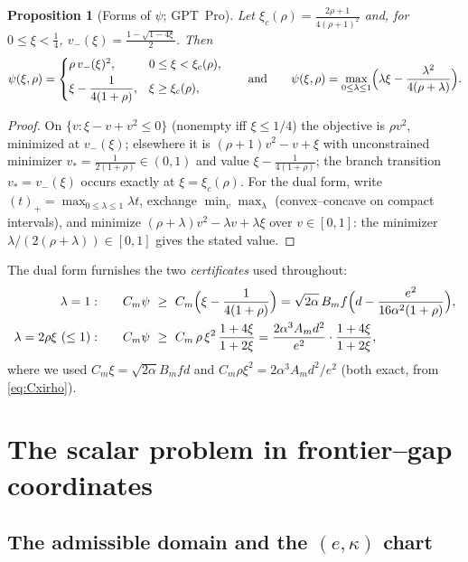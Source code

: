 \documentclass[11pt]{article}
\newtheorem{proposition}[theorem]{Proposition}
\newcommand{\pos}[1]{\left(#1\right)_{+}}
\begin{document}
\begin{proposition}[Forms of $\psi$; GPT~Pro]\label{prop:psi-forms}
Let $\xi_c(\rho)=\frac{2\rho+1}{4(\rho+1)^2}$ and, for $0\le\xi<\frac14$,
$v_-(\xi)=\frac{1-\sqrt{1-4\xi}}2$.  Then
\[
        \psi(\xi,\rho)=
        \begin{cases}
        \rho\,v_-(\xi)^2,&0\le\xi<\xi_c(\rho),\\[1mm]
        \xi-\dfrac1{4(1+\rho)},&\xi\ge\xi_c(\rho),
        \end{cases}
        \qquad\text{and}\qquad
        \psi(\xi,\rho)=\max_{0\le\lambda\le1}
        \Bigl(\lambda\xi-\frac{\lambda^2}{4(\rho+\lambda)}\Bigr).
\]
\end{proposition}

\begin{proof}
On $\{v:\xi-v+v^2\le0\}$ (nonempty iff $\xi\le1/4$) the objective is $\rho v^2$,
minimized at $v_-(\xi)$; elsewhere it is $(\rho+1)v^2-v+\xi$ with unconstrained
minimizer $v_*=\frac1{2(1+\rho)}\in(0,1)$ and value $\xi-\frac1{4(1+\rho)}$;
the branch transition $v_*=v_-(\xi)$ occurs exactly at $\xi=\xi_c(\rho)$.
For the dual form, write $\pos t=\max_{0\le\lambda\le1}\lambda t$, exchange
$\min_v\max_\lambda$ (convex--concave on compact intervals), and minimize
$(\rho+\lambda)v^2-\lambda v+\lambda\xi$ over $v\in[0,1]$: the minimizer
$\lambda/(2(\rho+\lambda))\in[0,1]$ gives the stated value.
\end{proof}

The dual form furnishes the two \emph{certificates} used throughout:
\begin{align}
\lambda=1:&\qquad
        C_m\psi\ \ge\ C_m\Bigl(\xi-\frac1{4(1+\rho)}\Bigr)
        =\sqrt{2\alpha}\,B_mf\Bigl(d-\frac{e^2}{16\alpha^2(1+\rho)}\Bigr),
        \label{eq:cert-II}\\
\lambda=2\rho\xi\ (\le1):&\qquad
        C_m\psi\ \ge\ C_m\,\rho\,\xi^2\,\frac{1+4\xi}{1+2\xi}
        =\frac{2\alpha^3A_md^2}{e^2}\cdot\frac{1+4\xi}{1+2\xi},
        \label{eq:cert-I}
\end{align}
where we used $C_m\xi=\sqrt{2\alpha}B_mfd$ and
$C_m\rho\xi^2=2\alpha^3A_md^2/e^2$ (both exact, from
\eqref{eq:Cxirho}).

\section{The scalar problem in frontier--gap coordinates}\label{sec:coords}

\subsection{The admissible domain and the \texorpdfstring{$(e,\kappa)$}{(e, kappa)} chart}
\end{document}
